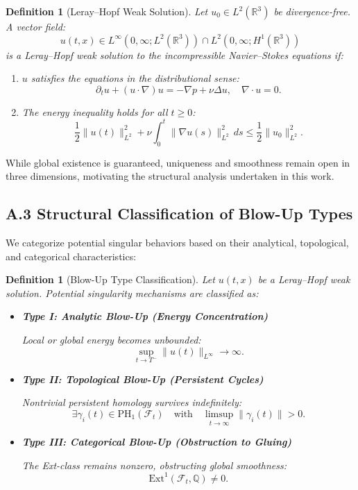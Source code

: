 \documentclass[11pt]{article}
\newtheorem{definition}[theorem]{Definition}
\begin{document}
\begin{definition}[Leray–Hopf Weak Solution]
Let \( u_0 \in L^2(\mathbb{R}^3) \) be divergence-free. A vector field:
\[
u(t, x) \in L^\infty(0,\infty; L^2(\mathbb{R}^3)) \cap L^2(0,\infty; H^1(\mathbb{R}^3))
\]
is a Leray–Hopf weak solution to the incompressible Navier–Stokes equations if:

\begin{enumerate}
  \item \( u \) satisfies the equations in the distributional sense:
  \[
  \partial_t u + (u \cdot \nabla) u = - \nabla p + \nu \Delta u, \quad \nabla \cdot u = 0.
  \]
  \item The energy inequality holds for all \( t \geq 0 \):
  \[
  \frac{1}{2} \| u(t) \|_{L^2}^2 + \nu \int_0^t \| \nabla u(s) \|_{L^2}^2 \, ds \leq \frac{1}{2} \| u_0 \|_{L^2}^2.
  \]
\end{enumerate}
\end{definition}

While global existence is guaranteed, uniqueness and smoothness remain open in three dimensions, motivating the structural analysis undertaken in this work.

\subsection*{A.3 Structural Classification of Blow-Up Types}

We categorize potential singular behaviors based on their analytical, topological, and categorical characteristics:

\begin{definition}[Blow-Up Type Classification]
Let \( u(t,x) \) be a Leray–Hopf weak solution. Potential singularity mechanisms are classified as:

\begin{itemize}
  \item \textbf{Type I: Analytic Blow-Up (Energy Concentration)}
  
  Local or global energy becomes unbounded:
  \[
  \sup_{t \to T^-} \| u(t) \|_{L^\infty} \to \infty.
  \]

  \item \textbf{Type II: Topological Blow-Up (Persistent Cycles)}
  
  Nontrivial persistent homology survives indefinitely:
  \[
  \exists \gamma_i(t) \in \mathrm{PH}_1(\mathcal{F}_t) \quad \text{with} \quad \limsup_{t \to \infty} \| \gamma_i(t) \| > 0.
  \]

  \item \textbf{Type III: Categorical Blow-Up (Obstruction to Gluing)}
  
  The Ext-class remains nonzero, obstructing global smoothness:
  \[
  \mathrm{Ext}^1(\mathcal{F}_t, \mathbb{Q}) \neq 0.
  \]
\end{itemize}
\end{definition}
\end{document}
